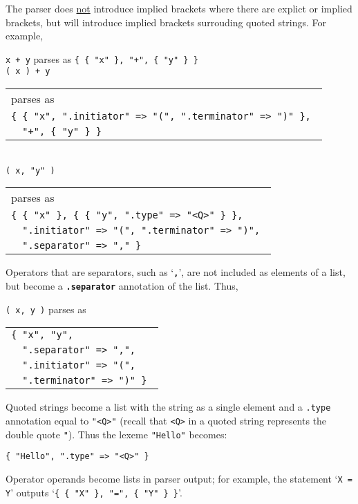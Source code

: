 \documentclass[12pt]{article}
\newcommand{\TT}[1]{{\tt \bfseries #1}}
\newcommand{\ttkey}[1]{{\tt \bfseries #1}}
\newenvironment{indpar}[1][0.3in]%
	{\begin{list}{}%
		     {\setlength{\itemsep}{0in}%
		      \setlength{\topsep}{0in}%
		      \setlength{\parsep}{1ex}%
		      \setlength{\labelwidth}{#1}%
		      \setlength{\leftmargin}{#1}%
		      \addtolength{\leftmargin}{\labelsep}}%
	 \item}%
	{\end{list}}
\begin{document}
The parser does \underline{not} introduce implied brackets where there
are explict or implied brackets, but will introduce implied brackets
surrouding quoted strings.  For example,
\begin{indpar}
{\tt x + y} parses as {\tt \{ \{ "x" \}, "+", \{ "y" \} \}} \\
{\tt ( x ) + y} \begin{tabular}[t]{@{}l@{}}
		parses as \\
                \tt \{ \{ "x", ".initiator" => "(", ".terminator" => ")" \}, \\
		\tt ~~"+", \{ "y" \} \} \\
                \end{tabular} \\
{\tt ( x, "y" )} \begin{tabular}[t]{@{}l@{}}
		parses as \\
                \tt \{ \{ "x" \}, \{ \{ "y", ".type" => "<Q>" \} \}, \\
		\tt ~~".initiator" => "(", ".terminator" => ")", \\
		\tt ~~".separator" => "," \} \\
                \end{tabular}
\end{indpar}

Operators that are separators, such as `\TT{,}', are not included as elements
of a list, but become a \ttkey{.separator} annotation of the list.  Thus,
\begin{indpar}
{\tt ( x, y )} parses as \begin{tabular}[t]{@{}l@{}}
                \tt \{ "x", "y", \\
		\tt ~~".separator" => ",", \\
		\tt ~~".initiator" => "(", \\
		\tt ~~".terminator" => ")" \} \\
                \end{tabular}
\end{indpar}

Quoted strings become a list with the string as a single element
and a {\tt .type} annotation equal to {\tt "<Q>"}
(recall that {\tt <Q>} in a quoted string represents the double quote {\tt "}).
Thus the lexeme {\tt "Hello"} becomes: \\
\centerline{\tt \{ "Hello", ".type" => "<Q>" \} }

Operator operands become lists in parser output;
for example, the statement `{\tt X = Y}' outputs
`{\tt \{ \{ "X" \}, "=", \{ "Y" \} \}}'.
\end{document}
